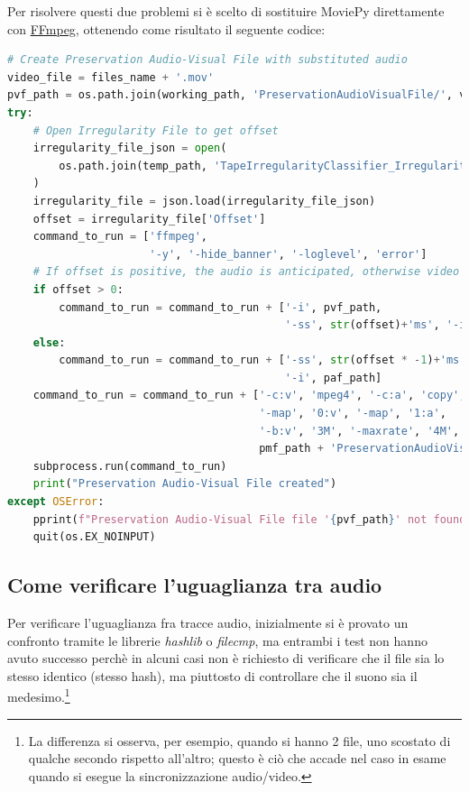 Per risolvere questi due problemi si è scelto di sostituire MoviePy direttamente con \href{https://ffmpeg.org/}{FFmpeg}, ottenendo come risultato il seguente codice:
\begin{lstlisting}[language=Python, caption={Codice finale, creazione PreservationAudioVisualFile}]
# Create Preservation Audio-Visual File with substituted audio
video_file = files_name + '.mov'
pvf_path = os.path.join(working_path, 'PreservationAudioVisualFile/', video_file)
try:
    # Open Irregularity File to get offset
    irregularity_file_json = open(
        os.path.join(temp_path, 'TapeIrregularityClassifier_IrregularityFileOutput2.json')
    )
    irregularity_file = json.load(irregularity_file_json)
    offset = irregularity_file['Offset']
    command_to_run = ['ffmpeg',
                      '-y', '-hide_banner', '-loglevel', 'error']
    # If offset is positive, the audio is anticipated, otherwise video is anticipated (through seek)
    if offset > 0:
        command_to_run = command_to_run + ['-i', pvf_path,
                                           '-ss', str(offset)+'ms', '-i', paf_path]
    else:
        command_to_run = command_to_run + ['-ss', str(offset * -1)+'ms', '-i', pvf_path,
                                           '-i', paf_path]
    command_to_run = command_to_run + ['-c:v', 'mpeg4', '-c:a', 'copy',
                                       '-map', '0:v', '-map', '1:a',
                                       '-b:v', '3M', '-maxrate', '4M', '-bufsize', '4M',
                                       pmf_path + 'PreservationAudioVisualFile.mov']
    subprocess.run(command_to_run)
    print("Preservation Audio-Visual File created")
except OSError:
    pprint(f"Preservation Audio-Visual File file '{pvf_path}' not found!", color=Color.RED)
    quit(os.EX_NOINPUT)
\end{lstlisting}


\subsection{Come verificare l'uguaglianza tra audio} \label{ssec:packager-audio}    %
Per verificare l'uguaglianza fra tracce audio, inizialmente si è provato un confronto tramite le librerie \textit{hashlib} o \textit{filecmp}, ma entrambi i test non hanno avuto successo perchè in alcuni casi non è richiesto di verificare che il file sia lo stesso identico (stesso hash), ma piuttosto di controllare che il suono sia il medesimo.\footnote{La differenza si osserva, per esempio, quando si hanno 2 file, uno scostato di qualche secondo rispetto all'altro; questo è ciò che accade nel caso in esame quando si esegue la sincronizzazione audio/video.}

